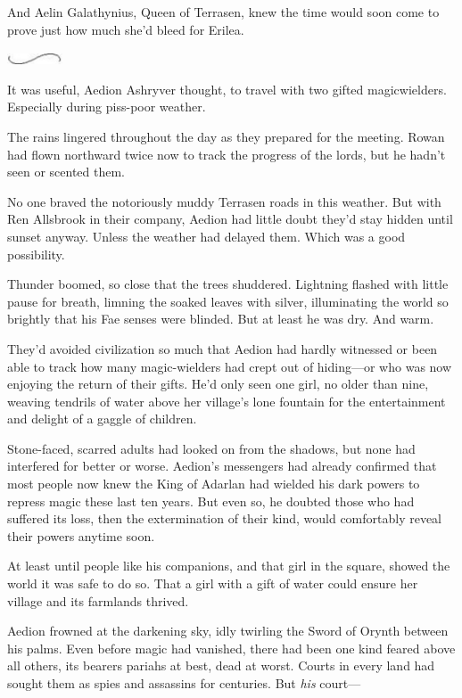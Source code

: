 And Aelin Galathynius, Queen of Terrasen, knew the time would soon come to prove just how much she'd bleed for Erilea.

\begin{center}
    \includegraphics[width=0.65in,height=0.13in]{images/seperator}
\end{center}

It was useful, Aedion Ashryver thought, to travel with two gifted magicwielders.
Especially during piss-poor weather.

The rains lingered throughout the day as they prepared for the meeting.
Rowan had flown northward twice now to track the progress of the lords, but he hadn't seen or scented them.

No one braved the notoriously muddy Terrasen roads in this weather.
But with Ren Allsbrook in their company, Aedion had little doubt they'd stay hidden until sunset anyway.
Unless the weather had delayed them.
Which was a good possibility.

Thunder boomed, so close that the trees shuddered.
Lightning flashed with little pause for breath, limning the soaked leaves with silver, illuminating the world so brightly that his Fae senses were blinded.
But at least he was dry.
And warm.

They'd avoided civilization so much that Aedion had hardly witnessed or been able to track how many magic-wielders had crept out of hiding---or who was now enjoying the return of their gifts.
He'd only seen one girl, no older than nine, weaving tendrils of water above her village's lone fountain for the entertainment and delight of a gaggle of children.

Stone-faced, scarred adults had looked on from the shadows, but none had interfered for better or worse.
Aedion's messengers had already confirmed that most people now knew the King of Adarlan had wielded his dark powers to repress magic these last ten years.
But even so, he doubted those who had suffered its loss, then the extermination of their kind, would comfortably reveal their powers anytime soon.

At least until people like his companions, and that girl in the square, showed the world it was safe to do so.
That a girl with a gift of water could ensure her village and its farmlands thrived.

Aedion frowned at the darkening sky, idly twirling the Sword of Orynth between his palms.
Even before magic had vanished, there had been one kind feared above all others, its bearers pariahs at best, dead at worst.
Courts in every land had sought them as spies and assassins for centuries.
But \emph{his} court---

